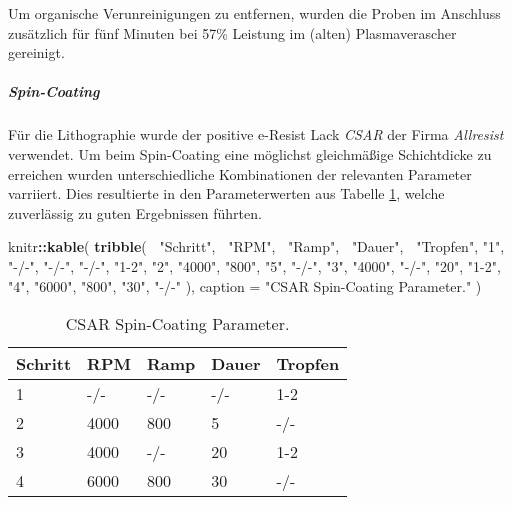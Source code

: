\documentclass[
  paper=a4,
  ,captions=tableheading
]{scrartcl}
\newenvironment{Shaded}{\begin{snugshade}}{\end{snugshade}}
\newcommand{\DataTypeTok}[1]{\textcolor[rgb]{0.13,0.29,0.53}{#1}}
\newcommand{\KeywordTok}[1]{\textcolor[rgb]{0.13,0.29,0.53}{\textbf{#1}}}
\newcommand{\NormalTok}[1]{#1}
\newcommand{\OperatorTok}[1]{\textcolor[rgb]{0.81,0.36,0.00}{\textbf{#1}}}
\newcommand{\StringTok}[1]{\textcolor[rgb]{0.31,0.60,0.02}{#1}}
\begin{document}
Um organische Verunreinigungen zu entfernen, wurden die Proben im Anschluss zusätzlich für fünf Minuten bei 57\% Leistung im (alten) Plasmaverascher gereinigt.

\hypertarget{spin-coating}{%
\subparagraph{Spin-Coating}\label{spin-coating}}

Für die Lithographie wurde der positive e-Resist Lack \emph{CSAR} der Firma \emph{Allresist} verwendet. Um beim Spin-Coating eine möglichst gleichmäßige Schichtdicke zu erreichen wurden unterschiedliche Kombinationen der relevanten Parameter varriiert. Dies resultierte in den Parameterwerten aus Tabelle \ref{tab:prep-spin}, welche zuverlässig zu guten Ergebnissen führten.

\begin{Shaded}
\begin{Highlighting}[]
\NormalTok{knitr}\OperatorTok{::}\KeywordTok{kable}\NormalTok{(}
  \KeywordTok{tribble}\NormalTok{(}
    \OperatorTok{~}\StringTok{"Schritt"}\NormalTok{, }\OperatorTok{~}\StringTok{"RPM"}\NormalTok{, }\OperatorTok{~}\StringTok{"Ramp"}\NormalTok{, }\OperatorTok{~}\StringTok{"Dauer"}\NormalTok{, }\OperatorTok{~}\StringTok{"Tropfen"}\NormalTok{,}
    \StringTok{"1"}\NormalTok{, }\StringTok{"-/-"}\NormalTok{, }\StringTok{"-/-"}\NormalTok{, }\StringTok{"-/-"}\NormalTok{, }\StringTok{"1-2"}\NormalTok{,}
    \StringTok{"2"}\NormalTok{, }\StringTok{"4000"}\NormalTok{, }\StringTok{"800"}\NormalTok{, }\StringTok{"5"}\NormalTok{, }\StringTok{"-/-"}\NormalTok{,}
    \StringTok{"3"}\NormalTok{, }\StringTok{"4000"}\NormalTok{, }\StringTok{"-/-"}\NormalTok{, }\StringTok{"20"}\NormalTok{, }\StringTok{"1-2"}\NormalTok{,}
    \StringTok{"4"}\NormalTok{, }\StringTok{"6000"}\NormalTok{, }\StringTok{"800"}\NormalTok{, }\StringTok{"30"}\NormalTok{, }\StringTok{"-/-"}
\NormalTok{  ),}
  \DataTypeTok{caption =} \StringTok{"CSAR Spin-Coating Parameter."}
\NormalTok{)}
\end{Highlighting}
\end{Shaded}

\begin{table}

\caption{\label{tab:prep-spin}CSAR Spin-Coating Parameter.}
\centering
\begin{tabular}[t]{l|l|l|l|l}
\hline
Schritt & RPM & Ramp & Dauer & Tropfen\\
\hline
1 & -/- & -/- & -/- & 1-2\\
\hline
2 & 4000 & 800 & 5 & -/-\\
\hline
3 & 4000 & -/- & 20 & 1-2\\
\hline
4 & 6000 & 800 & 30 & -/-\\
\hline
\end{tabular}
\end{table}
\end{document}
